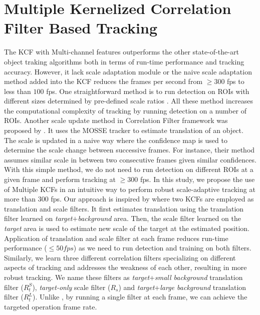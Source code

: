 \documentclass[10pt,twocolumn,letterpaper]{article}
\begin{document}
\section{Multiple Kernelized Correlation Filter Based Tracking}
\label{sc:MKCF}
The KCF with Multi-channel features outperforms the other state-of-the-art object traking algorithms both in terms of run-time performance and tracking accuracy. However, it lack scale adaptation module or the naive scale adaptation method added into the KCF reduces the frames per second from $\geq300$ fps to less than $100$ fps. One straightforward method is to run detection on ROIs with different sizes determined by pre-defined scale ratios \cite{henriques2015high,tang2015multi,ma2015long,bibi2015multi,li2014scale}. All these method increases the computational complexity of tracking by running detection on a number of ROIs. Another scale update method in Correlation Filter framework was proposed by \cite{zhang2014fast}. It uses the MOSSE tracker to estimate translation of an object. The scale is updated in a naive way where the confidence map is used to determine the scale change between successive frames. For instance, their method assumes similar scale in between two consecutive frames given similar confidences. With this simple method, we do not need to run detection on different ROIs at a given frame and perform tracking at $\geq300$ fps. In this study, we propose the use of Multiple KCFs in an intuitive way to perform robust scale-adaptive tracking at more than $300$ fps. Our approach is inspired by \cite{ma2015long} where two KCFs are employed as translation and scale filters. It first estimates translation using the translation filter learned on \textit{target}$+$\textit{background} area. Then, the scale filter learned on the \textit{target} area is used to estimate new scale of the target at the estimated position. Application of translation and scale filter at each frame reduces run-time performance ($\leq50 fps$) as we need to run detection and training on both filters. Similarly, we learn three different correlation filters specializing on different aspects of tracking and addresses the weakness of each other, resulting in more robust tracking. We name these filters as \textit{target}+\textit{small background} translation filter ($R_{t}^{S}$), \textit{target-only} scale filter ($R_{s}$) and \textit{target}+\textit{large background} translation filter ($R_{t}^{L}$). Unlike \cite{ma2015long}, by running a single filter at each frame, we can achieve the targeted operation frame rate.
\end{document}
